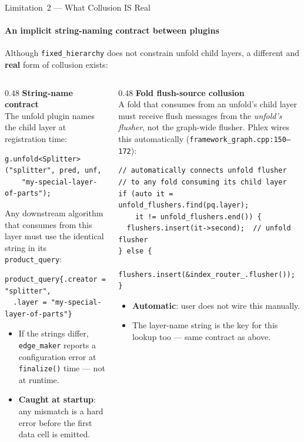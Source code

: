 \documentclass[aspectratio=169,10pt]{beamer}
\newcommand{\good}[1]{\textcolor{green!50!black}{\textbf{#1}}}
\newcommand{\warn}[1]{\textcolor{orange!80!black}{\textbf{#1}}}
\newcommand{\code}[1]{\texttt{\small #1}}
\begin{document}

\begin{frame}[fragile]{Limitation~2 --- What Collusion IS Real}
  \framesubtitle{An implicit string-naming contract between plugins}

  Although \code{fixed\_hierarchy} does not constrain unfold child layers,
  a different and \warn{real} form of collusion exists:

  \begin{columns}[T]
    \begin{column}{0.48\textwidth}
      \textbf{String-name contract} \\[2pt]
      \small
      The unfold plugin names the child layer at registration time:
      \begin{lstlisting}
g.unfold<Splitter>("splitter", pred, unf,
    "my-special-layer-of-parts");
      \end{lstlisting}
      Any downstream algorithm that consumes from this layer must use
      the identical string in its \code{product\_query}:
      \begin{lstlisting}
product_query{.creator = "splitter",
  .layer = "my-special-layer-of-parts"}
      \end{lstlisting}
      \begin{itemize}\tiny
        \item If the strings differ, \code{edge\_maker} reports a
              configuration error at \code{finalize()} time --- not at
              runtime.
        \item \good{Caught at startup}: any mismatch is a hard error
              before the first data cell is emitted.
      \end{itemize}
    \end{column}
    \begin{column}{0.48\textwidth}
      \textbf{Fold flush-source collusion} \\[2pt]
      \small
      A fold that consumes from an unfold's child layer must receive
      flush messages from the \emph{unfold's flusher}, not the
      graph-wide flusher.  Phlex wires this automatically
      (\texttt{framework\_graph.cpp:150--172}):
      \begin{lstlisting}
// automatically connects unfold flusher
// to any fold consuming its child layer
if (auto it = unfold_flushers.find(pq.layer);
    it != unfold_flushers.end()) {
  flushers.insert(it->second);  // unfold flusher
} else {
  flushers.insert(&index_router_.flusher());
}
      \end{lstlisting}
      \begin{itemize}\tiny
        \item \good{Automatic}: user does not wire this manually.
        \item The layer-name string is the key for this lookup too ---
              same contract as above.
      \end{itemize}
    \end{column}
  \end{columns}


\end{frame}
\end{document}
